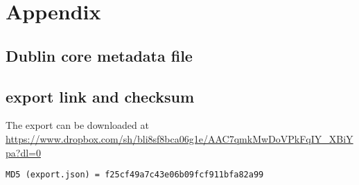 \appendix
\section{Appendix}\label{sec:appendix}
\subsection{Dublin core metadata file}

\subsection{export link and checksum}
The export can be downloaded at \url{https://www.dropbox.com/sh/bli8sf8bca06g1e/AAC7qmkMwDoVPkFqIY_XBiYpa?dl=0}
\begin{lstlisting}
MD5 (export.json) = f25cf49a7c43e06b09fcf911bfa82a99
\end{lstlisting}



